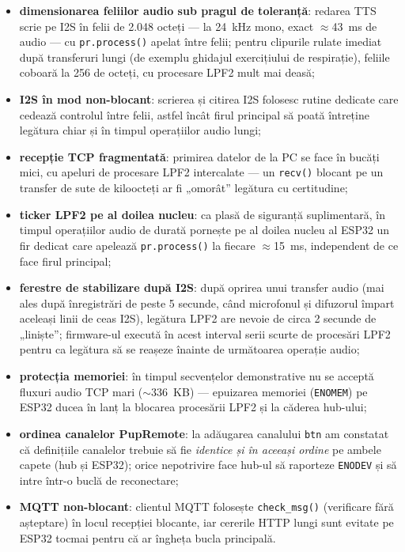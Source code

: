 \begin{itemize}
    \item \textbf{dimensionarea felii\-lor audio sub pragul de toleranță}: redarea TTS scrie pe I2S în felii de 2.048 octeți — la 24~kHz mono, exact $\approx$43~ms de audio — cu \texttt{pr.process()} apelat între felii; pentru clipurile rulate imediat după transferuri lungi (de exemplu ghidajul exercițiului de respirație), feliile coboară la 256 de octeți, cu procesare LPF2 mult mai deasă;
    \item \textbf{I2S în mod non-blocant}: scrierea și citirea I2S folosesc rutine dedicate care cedează controlul între felii, astfel încât firul principal să poată întreține legătura chiar și în timpul operațiilor audio lungi;
    \item \textbf{recepție TCP fragmentată}: primirea datelor de la PC se face în bucăți mici, cu apeluri de procesare LPF2 intercalate — un \texttt{recv()} blocant pe un transfer de sute de kiloocteți ar fi „omorât” legătura cu certitudine;
    \item \textbf{ticker LPF2 pe al doilea nucleu}: ca plasă de siguranță suplimentară, în timpul operațiilor audio de durată pornește pe al doilea nucleu al ESP32 un fir dedicat care apelează \texttt{pr.process()} la fiecare $\approx$15~ms, independent de ce face firul principal;
    \item \textbf{ferestre de stabilizare după I2S}: după oprirea unui transfer audio (mai ales după înregistrări de peste 5 secunde, când microfonul și difuzorul împart aceleași linii de ceas I2S), legătura LPF2 are nevoie de circa 2 secunde de „liniște”; firmware-ul execută în acest interval serii scurte de procesări LPF2 pentru ca legătura să se reașeze înainte de următoarea operație audio;
    \item \textbf{protecția memoriei}: în timpul secvențelor demonstrative nu se acceptă fluxuri audio TCP mari ($\sim$336~KB) — epuizarea memoriei (\texttt{ENOMEM}) pe ESP32 ducea în lanț la blocarea procesării LPF2 și la căderea hub-ului;
    \item \textbf{ordinea canalelor PupRemote}: la adăugarea canalului \texttt{btn} am constatat că definițiile canalelor trebuie să fie \emph{identice și în aceeași ordine} pe ambele capete (hub și ESP32); orice nepotrivire face hub-ul să raporteze \texttt{ENODEV} și să intre într-o buclă de reconectare;
    \item \textbf{MQTT non-blocant}: clientul MQTT folosește \texttt{check\_msg()} (verificare fără așteptare) în locul recepției blocante, iar cererile HTTP lungi sunt evitate pe ESP32 tocmai pentru că ar îngheța bucla principală.
\end{itemize}

